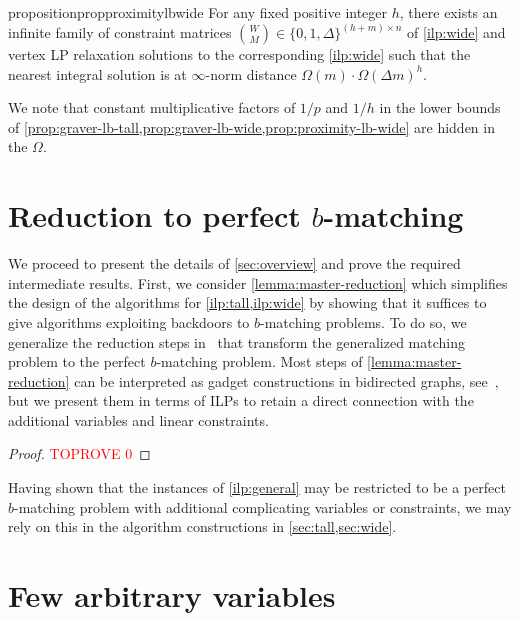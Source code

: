 \documentclass[a4paper,UKenglish,cleveref,thm-restate]{lipics-v2021}
\begin{document}
{\begin{restatable}{proposition}{propproximitylbwide}
    For any fixed positive integer $h$, there exists an infinite family of constraint matrices $\binom WM\in\{0,1,\Delta\}^{(h+m)\times n}$ of \cref{ilp:wide} and vertex LP relaxation solutions to the corresponding \cref{ilp:wide} such that the nearest integral solution is at $\infty$-norm distance $\Omega(m)\cdot\Omega(\Delta m)^h$.
    \label{prop:proximity-lb-wide}
\end{restatable}

We note that constant multiplicative factors of $1/p$ and $1/h$ in the lower bounds of \cref{prop:graver-lb-tall,prop:graver-lb-wide,prop:proximity-lb-wide} are hidden in the $\Omega$.

} 
\section[Reduction to perfect b-matching]{Reduction to perfect $b$-matching}
\label{sec:master-reduction}

We proceed to present the details of \cref{sec:overview} and prove the required intermediate results. First, we consider \cref{lemma:master-reduction} which simplifies the design of the algorithms for \cref{ilp:tall,ilp:wide} by showing that it suffices to give algorithms exploiting backdoors to $b$-matching problems. To do so, we generalize the reduction steps in~\cite{schrijver2003combinatorial} that transform the generalized matching problem to the perfect $b$-matching problem. Most steps of \cref{lemma:master-reduction} can be interpreted as gadget constructions in bidirected graphs, see~\cite{schrijver2003combinatorial}, but we present them in terms of ILPs to retain a direct connection with the additional variables and linear constraints.

\lemmamasterreduction*

\begin{proof}\textcolor{red}{TOPROVE 0}\end{proof}

Having shown that the instances of \cref{ilp:general} may be restricted to be a perfect $b$-matching problem with additional complicating variables or constraints, we may rely on this in the algorithm constructions in \cref{sec:tall,sec:wide}. 
\section{Few arbitrary variables}
\label{sec:tall}
\end{document}

